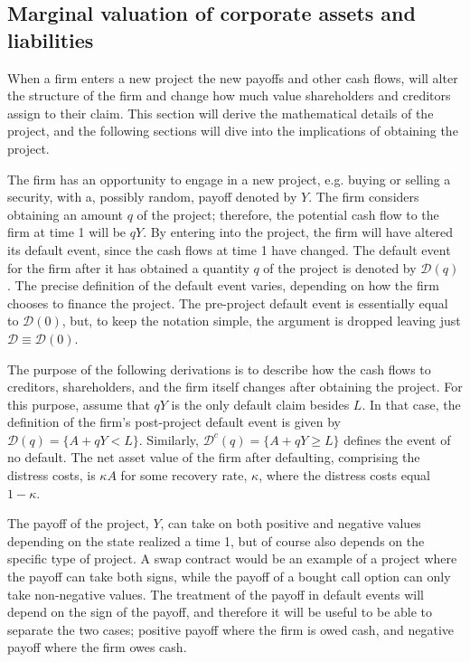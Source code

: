 \documentclass[main.tex]{subfiles}
\begin{document}
    \subsection{Marginal valuation of corporate assets and liabilities}
        When a firm enters a new project the new payoffs and other cash flows,
        will alter the structure of the firm and
        change how much value shareholders and creditors assign to their claim.
        This section will derive the mathematical details of the project,
        and the following sections will dive into the implications of obtaining the project.

        The firm has an opportunity to engage in a new project, e.g. buying or selling a security,
        with a, possibly random, payoff denoted by $Y$.
        The firm considers obtaining an amount $q$ of the project;
        therefore, the potential cash flow to the firm at time 1 will be $qY$.
        By entering into the project, the firm will have altered its default event,
        since the cash flows at time 1 have changed.
        The default event for the firm after it has obtained a quantity $q$ of the project
        is denoted by $\mathcal{D}(q)$.
        The precise definition of the default event varies, 
        depending on how the firm chooses to finance the project.
        The pre-project default event is essentially equal to $\mathcal{D}(0)$,
        but, to keep the notation simple, the argument is dropped leaving just 
        $\mathcal{D}\equiv\mathcal{D}(0)$.

        The purpose of the following derivations is to describe how the cash flows
        to creditors, shareholders, and the firm itself changes after obtaining the project.
        For this purpose, assume that $qY$ is the only default claim besides $L$. 
        In that case, the definition of the firm's post-project default event is given by 
        $\mathcal{D}(q) = \{A + qY < L\}$.
        Similarly, $\mathcal{D}^{c}(q) = \{A + qY \geq L\}$ defines the event of no default.
        The net asset value of the firm after defaulting, comprising the distress costs, is $\kappa A$ for some recovery rate, $\kappa$, where the distress costs equal $1-\kappa$.

        The payoff of the project, $Y$, can take on both positive and negative values
        depending on the state realized a time 1, 
        but of course also depends on the specific type of project. 
        A swap contract would be an example of a project where the payoff can take both signs,
        while the payoff of a bought call option can only take non-negative values.
        The treatment of the payoff in default events will depend on the sign of the payoff,
        and therefore it will be useful to be able to separate the two cases;
        positive payoff where the firm is owed cash,
        and negative payoff where the firm owes cash.
\end{document}
